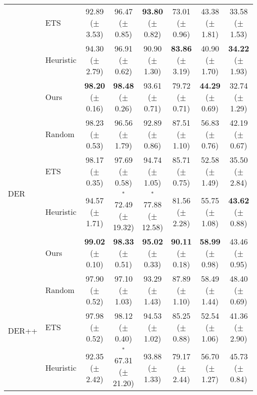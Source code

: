 \begin{table}[t]
{\begin{tabular}{l l c c c c c c}
     & ETS  & 92.89 {\scriptsize ($\pm$ 3.53)} & 96.47 {\scriptsize ($\pm$ 0.85)} & {\bf 93.80} {\scriptsize ($\pm$ 0.82)} & 73.01 {\scriptsize ($\pm$ 0.96)} & 43.38 {\scriptsize ($\pm$ 1.81)} & 33.58 {\scriptsize ($\pm$ 1.53)} \\
    & Heuristic & 94.30 {\scriptsize ($\pm$ 2.79)} & 96.91 {\scriptsize ($\pm$ 0.62)} & 90.90 {\scriptsize ($\pm$ 1.30)} & {\bf 83.86} {\scriptsize ($\pm$ 3.19)} & 40.90 {\scriptsize ($\pm$ 1.70)}  & {\bf 34.22} {\scriptsize ($\pm$ 1.93)} \\
    & Ours &  {\bf 98.20} {\scriptsize ($\pm$ 0.16)} & {\bf 98.48} {\scriptsize ($\pm$ 0.26)} &  93.61 {\scriptsize ($\pm$ 0.71)} & 79.72 {\scriptsize ($\pm$ 0.71)} & {\bf 44.29} {\scriptsize ($\pm$ 0.69)} & 32.74 {\scriptsize ($\pm$ 1.29)} \\  
    \midrule 
    \multirow{4}{*}{DER} & Random & 98.23 {\scriptsize ($\pm$ 0.53)} & 96.56 {\scriptsize ($\pm$ 1.79)}  & 92.89 {\scriptsize ($\pm$ 0.86)} & 87.51 {\scriptsize ($\pm$ 1.10)} & 56.83 {\scriptsize ($\pm$ 0.76)} & 42.19  {\scriptsize ($\pm$ 0.67)} \\ 
     & ETS  & 98.17 {\scriptsize ($\pm$ 0.35)} & 97.69 {\scriptsize ($\pm$ 0.58)} & 94.74 {\scriptsize ($\pm$ 1.05)} & 85.71 {\scriptsize ($\pm$ 0.75)} & 52.58 {\scriptsize ($\pm$ 1.49)} & 35.50  {\scriptsize ($\pm$ 2.84)} \\
    & Heuristic & 94.57 {\scriptsize ($\pm$ 1.71)} & $^{*}$72.49 {\scriptsize ($\pm$ 19.32)} & $^{*}$77.88 {\scriptsize ($\pm$ 12.58)} & 81.56 {\scriptsize ($\pm$ 2.28)} & 55.75 {\scriptsize ($\pm$ 1.08)} & {\bf 43.62} {\scriptsize ($\pm$ 0.88)} \\
     & Ours & {\bf 99.02} {\scriptsize ($\pm$ 0.10)} & {\bf 98.33} {\scriptsize ($\pm$ 0.51)} & {\bf 95.02} {\scriptsize ($\pm$ 0.33)} & {\bf 90.11} {\scriptsize ($\pm$ 0.18)} & {\bf 58.99} {\scriptsize ($\pm$ 0.98)} & 43.46  {\scriptsize ($\pm$ 0.95)}  \\  
    \midrule 
    \multirow{4}{*}{DER++} & Random & 97.90 {\scriptsize ($\pm$ 0.52)} & 97.10 {\scriptsize ($\pm$ 1.03)}  & 93.29 {\scriptsize ($\pm$ 1.43)} & 87.89 {\scriptsize ($\pm$ 1.10)} & 58.49  {\scriptsize ($\pm$ 1.44)} & 48.40  {\scriptsize ($\pm$ 0.69)} \\ 
     & ETS & 97.98 {\scriptsize ($\pm$ 0.52)} & 98.12 {\scriptsize ($\pm$ 0.40)} & 94.53 {\scriptsize ($\pm$ 1.02)} & 85.25 {\scriptsize ($\pm$ 0.88)} & 52.54  {\scriptsize ($\pm$ 1.06)} & 41.36  {\scriptsize ($\pm$ 2.90)} \\
    & Heuristic & 92.35 {\scriptsize ($\pm$ 2.42)} & $^{*}$67.31 {\scriptsize ($\pm$ 21.20)} & 93.88 {\scriptsize ($\pm$ 1.33)} & 79.17 {\scriptsize ($\pm$ 2.44)} & 56.70 {\scriptsize ($\pm$ 1.27)} & 45.73 {\scriptsize ($\pm$ 0.84)} \\

\end{tabular}}
\end{table}
